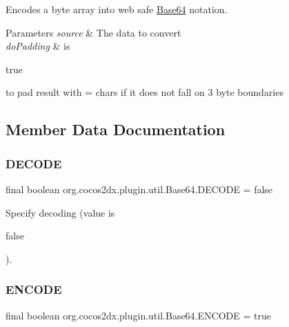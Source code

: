 Encodes a byte array into web safe \hyperlink{classorg_1_1cocos2dx_1_1plugin_1_1util_1_1Base64}{Base64} notation.


\begin{DoxyParams}{Parameters}
{\em source} & The data to convert \\
\hline
{\em do\+Padding} & is
\begin{DoxyCode}
\textcolor{keyword}{true} 
\end{DoxyCode}
 to pad result with \textquotesingle{}=\textquotesingle{} chars if it does not fall on 3 byte boundaries \\
\hline
\end{DoxyParams}


\subsection{Member Data Documentation}
\mbox{\label{classorg_1_1cocos2dx_1_1plugin_1_1util_1_1Base64_ac34d0f67dded79aa4e9439320e741d45}} 
\subsubsection{\texorpdfstring{D\+E\+C\+O\+DE}{DECODE}}
{\footnotesize\ttfamily final boolean org.\+cocos2dx.\+plugin.\+util.\+Base64.\+D\+E\+C\+O\+DE = false\hspace{0.3cm}{\ttfamily [static]}}

Specify decoding (value is
\begin{DoxyCode}
\textcolor{keyword}{false} 
\end{DoxyCode}
 ). \mbox{\label{classorg_1_1cocos2dx_1_1plugin_1_1util_1_1Base64_ae470fc5366fc836525ed00c85cff4d47}} 
\subsubsection{\texorpdfstring{E\+N\+C\+O\+DE}{ENCODE}}
{\footnotesize\ttfamily final boolean org.\+cocos2dx.\+plugin.\+util.\+Base64.\+E\+N\+C\+O\+DE = true\hspace{0.3cm}{\ttfamily [static]}}

